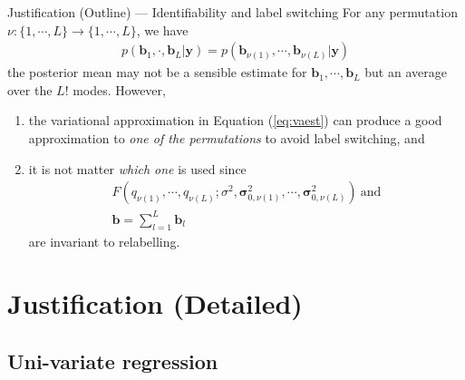 \documentclass[10pt]{beamer}
\begin{document}
\begin{frame}{Justification (Outline) --- \normalsize Identifiability and label switching}
    For any permutation $\nu:\{1,\cdots,L\}\to\{1,\cdots,L\}$, we have
    \begin{gather}
        p(\bm{b}_1,\cdot,\bm{b}_L|\bm{y}) 
        = p(\bm{b}_{\nu(1)},\cdots,\bm{b}_{\nu(L)}|\bm{y})
    \end{gather}
    the posterior mean may not be a sensible estimate for $\bm{b}_1,\cdots,\bm{b}_L$ but an average over the $L!$ modes.
    However, 
    \begin{enumerate}
        \item the variational approximation in Equation (\ref{eq:vaest}) 
    can produce a good approximation to \textit{one of the permutations} to avoid label switching, and%
        \item it is not matter \textit{which one} is used since 
        \begin{gather}
            F(q_{\nu(1)},\cdots,q_{\nu(L)};
            \sigma^2,
            \bm{\sigma}_{0,\nu(1)}^2,\cdots,\bm{\sigma}_{0,\nu(L)}^2)
            ~\text{and}\\
            \bm{b}=\sum_{l=1}^L\bm{b}_l
        \end{gather}
        are invariant to relabelling.
    \end{enumerate}
\end{frame}




\section{Justification (Detailed)}

\subsection{Uni-variate regression}
\end{document}
